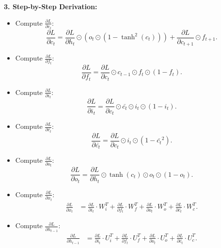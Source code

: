 \textbf{3. Step-by-Step Derivation:}
\begin{itemize}
    \item Compute \(\frac{\partial L}{\partial c_t}\):
    \[
    \frac{\partial L}{\partial c_t} = \frac{\partial L}{\partial h_t} \odot (o_t \odot (1 - \tanh^2(c_t))) + \frac{\partial L}{\partial c_{t+1}} \odot f_{t+1}.
    \]
    
    \item Compute \(\frac{\partial L}{\partial f_t}\):
    \[
    \frac{\partial L}{\partial f_t} = \frac{\partial L}{\partial c_t} \odot c_{t-1} \odot f_t \odot (1 - f_t).
    \]

    \item Compute \(\frac{\partial L}{\partial i_t}\):
    \[
    \frac{\partial L}{\partial i_t} = \frac{\partial L}{\partial c_t} \odot \bar{c_t} \odot i_t \odot (1 - i_t).
    \]
    
    \item Compute \(\frac{\partial L}{\partial \bar{c_t}}\):
    \[
    \frac{\partial L}{\partial \bar{c_t}} = \frac{\partial L}{\partial c_t} \odot i_t \odot (1 - \bar{c_t}^2).
    \]

    \item Compute \(\frac{\partial L}{\partial o_t}\):
    \[
    \frac{\partial L}{\partial o_t} = \frac{\partial L}{\partial h_t} \odot \tanh(c_t) \odot o_t \odot (1 - o_t).
    \]

    \item Compute \(\frac{\partial L}{\partial x_t}\):
    \[
    \begin{aligned}
    \frac{\partial L}{\partial x_t} &= \frac{\partial L}{\partial i_t} \cdot W_i^T + \frac{\partial L}{\partial f_t} \cdot W_f^T + \frac{\partial L}{\partial o_t} \cdot W_o^T + \frac{\partial L}{\partial \bar{c_t}} \cdot W_c^T.
    \end{aligned}
    \]

    \item Compute \(\frac{\partial L}{\partial h_{t-1}}\):
    \[
    \begin{aligned}
    \frac{\partial L}{\partial h_{t-1}} &= \frac{\partial L}{\partial i_t} \cdot U_i^T + \frac{\partial L}{\partial f_t} \cdot U_f^T + \frac{\partial L}{\partial o_t} \cdot U_o^T + \frac{\partial L}{\partial \bar{c_t}} \cdot U_c^T.
    \end{aligned}
    \]

\end{itemize}    